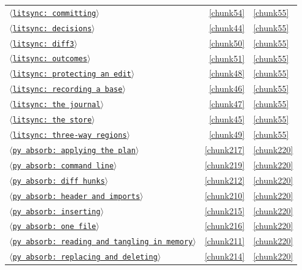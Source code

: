 \documentclass[10pt,a4paper]{article}
\newcounter{chunk}
\newcommand{\chunkname}[1]{\ensuremath{\langle}\texttt{#1}\ensuremath{\rangle}}
\begin{document}
\begin{longtable}{@{}p{}rp{}@{}}
\hyperref[chunk54]{\chunkname{litsync: committing}} & \ref*{chunk54} & \hyperref[chunk55]{\ref*{chunk55}} \\
\hyperref[chunk44]{\chunkname{litsync: decisions}} & \ref*{chunk44} & \hyperref[chunk55]{\ref*{chunk55}} \\
\hyperref[chunk50]{\chunkname{litsync: diff3}} & \ref*{chunk50} & \hyperref[chunk55]{\ref*{chunk55}} \\
\hyperref[chunk51]{\chunkname{litsync: outcomes}} & \ref*{chunk51} & \hyperref[chunk55]{\ref*{chunk55}} \\
\hyperref[chunk48]{\chunkname{litsync: protecting an edit}} & \ref*{chunk48} & \hyperref[chunk55]{\ref*{chunk55}} \\
\hyperref[chunk46]{\chunkname{litsync: recording a base}} & \ref*{chunk46} & \hyperref[chunk55]{\ref*{chunk55}} \\
\hyperref[chunk47]{\chunkname{litsync: the journal}} & \ref*{chunk47} & \hyperref[chunk55]{\ref*{chunk55}} \\
\hyperref[chunk45]{\chunkname{litsync: the store}} & \ref*{chunk45} & \hyperref[chunk55]{\ref*{chunk55}} \\
\hyperref[chunk49]{\chunkname{litsync: three-way regions}} & \ref*{chunk49} & \hyperref[chunk55]{\ref*{chunk55}} \\
\hyperref[chunk217]{\chunkname{py absorb: applying the plan}} & \ref*{chunk217} & \hyperref[chunk220]{\ref*{chunk220}} \\
\hyperref[chunk219]{\chunkname{py absorb: command line}} & \ref*{chunk219} & \hyperref[chunk220]{\ref*{chunk220}} \\
\hyperref[chunk212]{\chunkname{py absorb: diff hunks}} & \ref*{chunk212} & \hyperref[chunk220]{\ref*{chunk220}} \\
\hyperref[chunk210]{\chunkname{py absorb: header and imports}} & \ref*{chunk210} & \hyperref[chunk220]{\ref*{chunk220}} \\
\hyperref[chunk215]{\chunkname{py absorb: inserting}} & \ref*{chunk215} & \hyperref[chunk220]{\ref*{chunk220}} \\
\hyperref[chunk216]{\chunkname{py absorb: one file}} & \ref*{chunk216} & \hyperref[chunk220]{\ref*{chunk220}} \\
\hyperref[chunk211]{\chunkname{py absorb: reading and tangling in memory}} & \ref*{chunk211} & \hyperref[chunk220]{\ref*{chunk220}} \\
\hyperref[chunk214]{\chunkname{py absorb: replacing and deleting}} & \ref*{chunk214} & \hyperref[chunk220]{\ref*{chunk220}} \\

\end{longtable}
\end{document}
